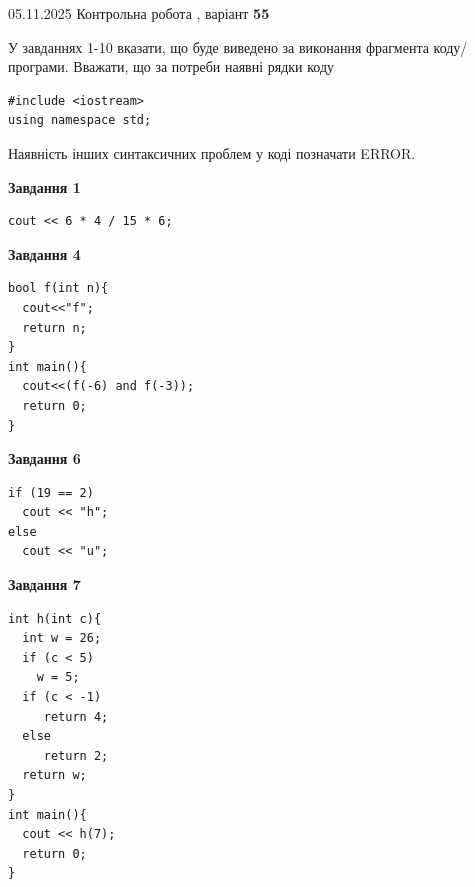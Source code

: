 \documentclass[12pt, ukrainian]{article}
\begin{document}
{\Large{05.11.2025 Контрольна робота , варіант  \No \textbf { 55 }\par}}
{
\begin {large}
У завданнях 1-10 вказати, що буде виведено за виконання фрагмента коду/про\-гра\-ми.
Вважати, що за потреби наявні рядки коду
\begin{verbatim}
#include <iostream>
using namespace std;
\end{verbatim}
Наявність інших синтаксичних проблем у коді позначати ERROR.

\begin{minipage}[t]{7.0cm}

\begin{center}
\textbf{Завдання 1}
\end{center}
\vspace{-8mm}

\begin{verbatim}
cout << 6 * 4 / 15 * 6;
\end{verbatim}



\begin{center}
\textbf{Завдання 4}
\end{center}
\vspace{-8mm}

\begin{verbatim}
bool f(int n){
  cout<<"f";
  return n;
}
int main(){
  cout<<(f(-6) and f(-3));
  return 0;
}
\end{verbatim}



\begin{center}
\textbf{Завдання 6}
\end{center}
\vspace{-8mm}

\begin{verbatim}
if (19 == 2)
  cout << "h";
else
  cout << "u";
\end{verbatim}



\begin{center}
\textbf{Завдання 7}
\end{center}
\vspace{-8mm}

\begin{verbatim}
int h(int c){
  int w = 26;
  if (c < 5)
    w = 5;
  if (c < -1)
     return 4;
  else
     return 2;
  return w;
}
int main(){
  cout << h(7);
  return 0;
}
\end{verbatim}


\end{minipage}
\end{large}}
\end{document}
